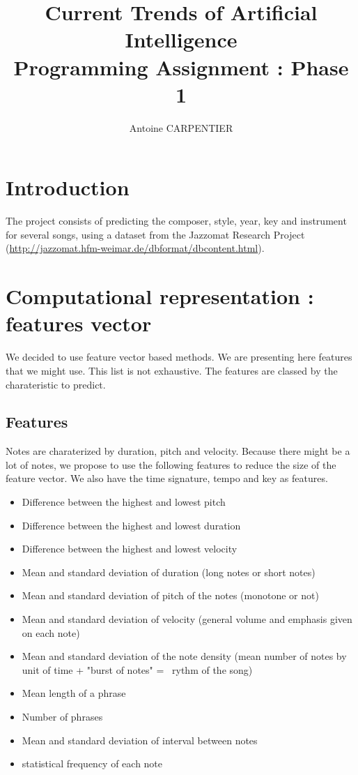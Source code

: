 \documentclass[a4paper,12pt]{article}
\author{Antoine CARPENTIER}
\title{Current Trends of Artificial Intelligence\\ \small Programming Assignment : Phase 1}
\begin{document}
\maketitle

\section{Introduction}

The project consists of predicting the composer, style, year, key and instrument for several songs, using a dataset from the Jazzomat Research Project (\url{http://jazzomat.hfm-weimar.de/dbformat/dbcontent.html}).

\section{Computational representation : features vector}

We decided to use feature vector based methods. We are presenting here features that we might use. This list is not exhaustive. The features are classed by the charateristic to predict.

\subsection{Features}
    Notes are charaterized by duration, pitch and velocity. Because there might be a lot of notes, we propose to use the following features to reduce the size of the feature vector. We also have the time signature, tempo and key as features.

    \begin{itemize}
        \item Difference between the highest and lowest pitch
        \item Difference between the highest and lowest duration
        \item Difference between the highest and lowest velocity
        \item Mean and standard deviation of duration (long notes or short notes)
        \item Mean and standard deviation of pitch of the notes (monotone or not)
        \item Mean and standard deviation of velocity (general volume and emphasis given on each note)
        \item Mean and standard deviation of the note density (mean number of notes by unit of time + "burst of notes" =~ rythm of the song) 
        \item Mean length of a phrase
        \item Number of phrases
        \item Mean and standard deviation of interval between notes
        \item statistical frequency of each note 
    \end{itemize}
\end{document}
